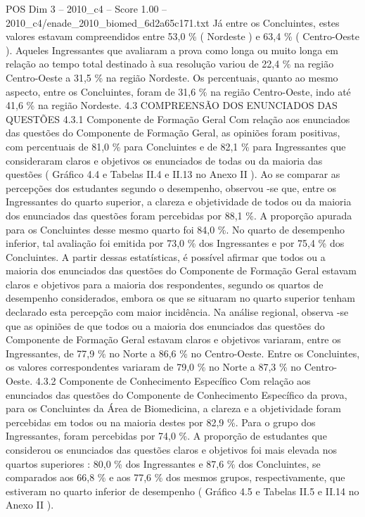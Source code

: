 \begin{textsample}{POS Dim 3 – 2010\_c4 – Score 1.00 – 2010\_c4/enade\_2010\_biomed\_6d2a65c171.txt}
Já entre os Concluintes, estes valores estavam compreendidos entre 53,0 \% ( Nordeste ) e 63,4 \% ( Centro-Oeste ).
Aqueles Ingressantes que avaliaram a prova como longa ou muito longa em relação ao tempo total destinado à sua resolução variou de 22,4 \% na região Centro-Oeste a 31,5 \% na região Nordeste.
Os percentuais, quanto ao mesmo aspecto, entre os Concluintes, foram de 31,6 \% na região Centro-Oeste, indo até 41,6 \% na região Nordeste. 4.3 COMPREENSÃO DOS ENUNCIADOS DAS QUESTÕES 4.3.1 Componente de Formação Geral Com relação aos enunciados das questões do Componente de Formação Geral, as opiniões foram positivas, com percentuais de 81,0 \% para Concluintes e de 82,1 \% para Ingressantes que consideraram claros e objetivos os enunciados de todas ou da maioria das questões ( Gráfico 4.4 e Tabelas II.4 e II.13 no Anexo II ).
Ao se comparar as percepções dos estudantes segundo o desempenho, observou -se que, entre os Ingressantes do quarto superior, a clareza e objetividade de todos ou da maioria dos enunciados das questões foram percebidas por 88,1 \%.
A proporção apurada para os Concluintes desse mesmo quarto foi 84,0 \%.
No quarto de desempenho inferior, tal avaliação foi emitida por 73,0 \% dos Ingressantes e por 75,4 \% dos Concluintes.
A partir dessas estatísticas, é possível afirmar que todos ou a maioria dos enunciados das questões do Componente de Formação Geral estavam claros e objetivos para a maioria dos respondentes, segundo os quartos de desempenho considerados, embora os que se situaram no quarto superior tenham declarado esta percepção com maior incidência.
Na análise regional, observa -se que as opiniões de que todos ou a maioria dos enunciados das questões do Componente de Formação Geral estavam claros e objetivos variaram, entre os Ingressantes, de 77,9 \% no Norte a 86,6 \% no Centro-Oeste.
Entre os Concluintes, os valores correspondentes variaram de 79,0 \% no Norte a 87,3 \% no Centro-Oeste. 4.3.2 Componente de Conhecimento Específico Com relação aos enunciados das questões do Componente de Conhecimento Específico da prova, para os Concluintes da Área de Biomedicina, a clareza e a objetividade foram percebidas em todos ou na maioria destes por 82,9 \%.
Para o grupo dos Ingressantes, foram percebidas por 74,0 \%.
A proporção de estudantes que considerou os enunciados das questões claros e objetivos foi mais elevada nos quartos superiores : 80,0 \% dos Ingressantes e 87,6 \% dos Concluintes, se comparados aos 66,8 \% e aos 77,6 \% dos mesmos grupos, respectivamente, que estiveram no quarto inferior de desempenho ( Gráfico 4.5 e Tabelas II.5 e II.14 no Anexo II ).

\end{textsample}
